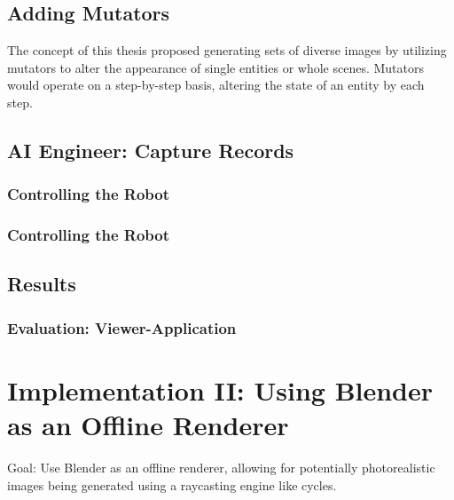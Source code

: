 \subsection{Adding Mutators}
The concept of this thesis proposed generating sets of diverse images by utilizing mutators to alter the appearance of single entities or whole scenes. Mutators would operate on a step-by-step basis, altering the state of an entity by each step.

\subsection{AI Engineer: Capture Records}
\subsubsection{Controlling the Robot}

\subsubsection{Controlling the Robot}

\subsection{Results}

\subsubsection{Evaluation: Viewer-Application}
\section{Implementation II: Using Blender as an Offline Renderer}
Goal: Use Blender as an offline renderer, allowing for potentially photorealistic images being generated using a raycasting engine like cycles.


